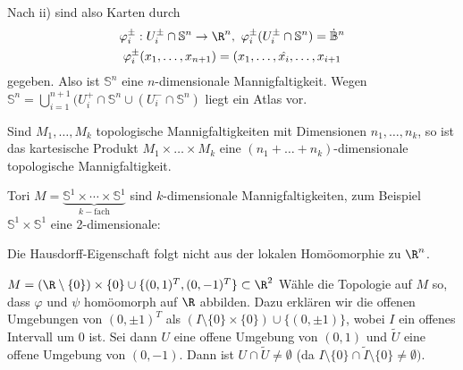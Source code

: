 \begin{exmp}
\begin{enumerate}[label= {\roman*})]
			Nach ii) sind also Karten durch
			\begin{gather*}
				\varphi_i^\pm : U_i^\pm \cap \mathbb{S}^n \to \R^n,\ \varphi_i^\pm(U_i^\pm \cap \mathbb{S}^n) = \dot{\mathbb{B}}^n \\
				\varphi_i^\pm(x_1,\dotsc,x_{n+1}) = (x_1,\dotsc,\hat{x_i},\dotsc,x_{i+1} 
			\end{gather*} gegeben. Also ist $\mathbb{S}^n$  eine $n$-dimensionale Mannigfaltigkeit. Wegen $\mathbb{S}^n = \bigcup_{i=1}^{n+1} (U_i^+ \cap \mathbb{S}^n \cup (U_i^- \cap \mathbb{S}^n)$ liegt ein Atlas vor.
	\end{enumerate}
\end{exmp}



\begin{lem}\label{lem1_3}
	Sind $ M_1, \dotsc, M_k $ topologische Mannigfaltigkeiten mit Dimensionen $ n_1,\dotsc,n_k $, so ist das kartesische Produkt $ M_1 \times \dots \times M_k $ eine $ (n_1 + \dots + n_k) $-dimensionale topologische Mannigfaltigkeit.
\end{lem}

\begin{exmp*}
	Tori $ M = \underbrace{\mathbb{S}^1 \times \dotsm \times \mathbb{S}^1}_{k-\text{fach}} $ sind $k$-dimensionale Mannigfaltigkeiten, zum Beispiel $\mathbb{S}^1 \times \mathbb{S}^1$ eine 2-dimensionale:
\end{exmp*}

\begin{rem*}
	Die Hausdorff-Eigenschaft folgt nicht aus der lokalen Homöomorphie zu $\R^n$.
\end{rem*}
	
\begin{exmp*}
	$ M = (\R \setminus \{0\}) \times \{0\} \cup \{ (0,1)^T, (0,-1)^T \} \subset \R^2 $
	Wähle die Topologie auf $M$ so, dass $\varphi$ und $\psi$ homöomorph auf $\R$ abbilden. Dazu erklären wir die offenen Umgebungen von $ (0,\pm 1)^T $ als $ (I \setminus \{0\} \times \{0\}) \cup \{(0,\pm 1)\}$, wobei $I$ ein offenes Intervall um 0 ist. Sei dann $U$ eine offene Umgebung von $(0,1) $ und $\tilde{U}$ eine offene Umgebung von $(0,-1)$. Dann ist $U \cap \tilde{U} \neq \emptyset$ (da $I \setminus \{0\} \cap \tilde{I}\setminus\{0\} \neq \emptyset).$
\end{exmp*}

